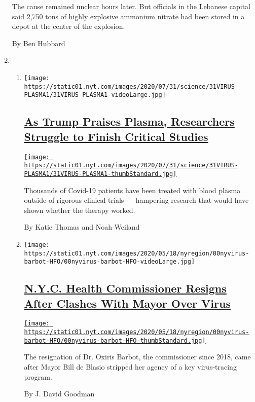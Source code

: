 \begin{enumerate}
  The cause remained unclear hours later. But officials in the Lebanese
  capital said 2,750 tons of highly explosive ammonium nitrate had been
  stored in a depot at the center of the explosion.

  By Ben Hubbard
\item
  \begin{enumerate}
  \def\labelenumii{\arabic{enumii}.}
  \item
    \texttt{[image: https://static01.nyt.com/images/2020/07/31/science/31VIRUS-PLASMA1/31VIRUS-PLASMA1-videoLarge.jpg]}

    \hypertarget{as-trump-praises-plasma-researchers-struggle-to-finish-critical-studies}{%
    \subsection{\texorpdfstring{\href{/2020/08/04/health/trump-plasma.html}{As
    Trump Praises Plasma, Researchers Struggle to Finish Critical
    Studies}}{As Trump Praises Plasma, Researchers Struggle to Finish Critical Studies}}\label{as-trump-praises-plasma-researchers-struggle-to-finish-critical-studies}}

    \href{/2020/08/04/health/trump-plasma.html}{\texttt{[image: https://static01.nyt.com/images/2020/07/31/science/31VIRUS-PLASMA1/31VIRUS-PLASMA1-thumbStandard.jpg]}}

    Thousands of Covid-19 patients have been treated with blood plasma
    outside of rigorous clinical trials --- hampering research that
    would have shown whether the therapy worked.

    By Katie Thomas and Noah Weiland
  \item
    \texttt{[image: https://static01.nyt.com/images/2020/05/18/nyregion/00nyvirus-barbot-HFO/00nyvirus-barbot-HFO-videoLarge.jpg]}

    \hypertarget{nyc-health-commissioner-resigns-after-clashes-with-mayor-over-virus}{%
    \subsection{\texorpdfstring{\href{/2020/08/04/nyregion/oxiris-barbot-health-commissioner-resigns.html}{N.Y.C.
    Health Commissioner Resigns After Clashes With Mayor Over
    Virus}}{N.Y.C. Health Commissioner Resigns After Clashes With Mayor Over Virus}}\label{nyc-health-commissioner-resigns-after-clashes-with-mayor-over-virus}}

    \href{/2020/08/04/nyregion/oxiris-barbot-health-commissioner-resigns.html}{\texttt{[image: https://static01.nyt.com/images/2020/05/18/nyregion/00nyvirus-barbot-HFO/00nyvirus-barbot-HFO-thumbStandard.jpg]}}

    The resignation of Dr. Oxiris Barbot, the commissioner since 2018,
    came after Mayor Bill de Blasio stripped her agency of a key
    virus-tracing program.

    By J. David Goodman
  \end{enumerate}
\end{enumerate}

